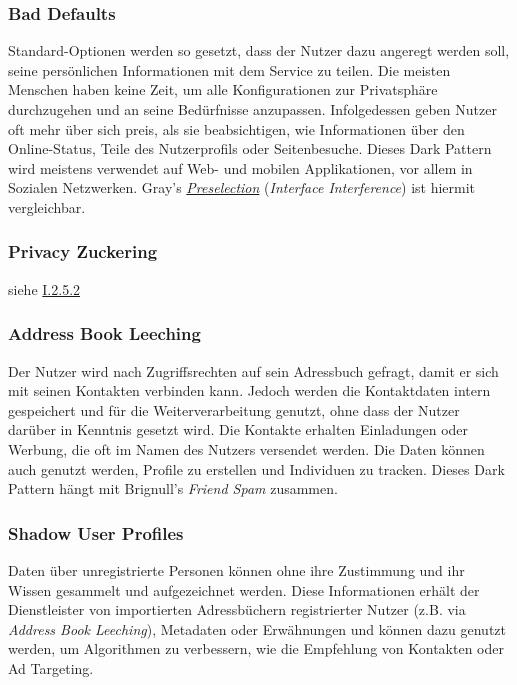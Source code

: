 \documentclass[a4paper]{article}
\begin{document}
\subsubsection{Bad Defaults}
\label{sssec:bad_defaults}
Standard-Optionen werden so gesetzt, dass der Nutzer dazu angeregt werden soll, seine persönlichen Informationen mit dem Service zu teilen. Die meisten Menschen haben keine Zeit, um alle Konfigurationen zur Privatsphäre durchzugehen und an seine Bedürfnisse anzupassen. Infolgedessen geben Nutzer oft mehr über sich preis, als sie beabsichtigen, wie Informationen über den Online-Status, Teile des Nutzerprofils oder Seitenbesuche. Dieses Dark Pattern wird meistens verwendet auf Web- und mobilen Applikationen, vor allem in Sozialen Netzwerken.\newline 
Gray's \hyperref[para:preselection]{\textit{Preselection}} (\textit{Interface Interference}) ist hiermit vergleichbar.

\subsubsection{Privacy Zuckering}
\label{sssec:privacy_zuckering2}
siehe \hyperref[para:privacy_zuckering]{I.2.5.2}

\subsubsection{Address Book Leeching}
\label{sssec:address_book_leeching}
Der Nutzer wird nach Zugriffsrechten auf sein Adressbuch gefragt, damit er sich mit seinen Kontakten verbinden kann. Jedoch werden die Kontaktdaten intern gespeichert und für die Weiterverarbeitung genutzt, ohne dass der Nutzer darüber in Kenntnis gesetzt wird. Die Kontakte erhalten Einladungen oder Werbung, die oft im Namen des Nutzers versendet werden. Die Daten können auch genutzt werden, Profile zu erstellen und Individuen zu tracken.\newline
Dieses Dark Pattern hängt mit Brignull's \textit{Friend Spam} zusammen.

\subsubsection{Shadow User Profiles}
\label{sssec:shadow_user_profiles}
Daten über unregistrierte Personen können ohne ihre Zustimmung und ihr Wissen gesammelt und aufgezeichnet werden. Diese Informationen erhält der Dienstleister von importierten Adressbüchern registrierter Nutzer (z.B. via \textit{Address Book Leeching}), Metadaten oder Erwähnungen und können dazu genutzt werden, um Algorithmen zu verbessern, wie die Empfehlung von Kontakten oder Ad Targeting.
\end{document}
